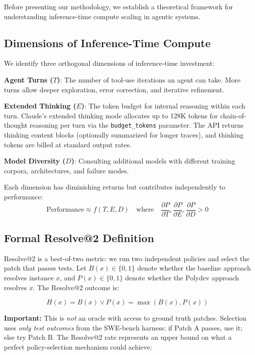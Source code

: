\documentclass[11pt,a4paper]{article}
\begin{document}
Before presenting our methodology, we establish a theoretical framework for understanding inference-time compute scaling in agentic systems.

\subsection{Dimensions of Inference-Time Compute}

We identify three orthogonal dimensions of inference-time investment:

\textbf{Agent Turns ($T$)}: The number of tool-use iterations an agent can take. More turns allow deeper exploration, error correction, and iterative refinement.

\textbf{Extended Thinking ($E$)}: The token budget for internal reasoning within each turn. Claude's extended thinking mode \citep{anthropic2024thinking,anthropic2024haiku45} allocates up to 128K tokens for chain-of-thought reasoning per turn via the \texttt{budget\_tokens} parameter. The API returns thinking content blocks (optionally summarized for longer traces), and thinking tokens are billed at standard output rates.

\textbf{Model Diversity ($D$)}: Consulting additional models with different training corpora, architectures, and failure modes.

Each dimension has diminishing returns but contributes independently to performance:
\begin{equation}
\text{Performance} \approx f(T, E, D) \quad \text{where} \quad \frac{\partial P}{\partial T}, \frac{\partial P}{\partial E}, \frac{\partial P}{\partial D} > 0
\end{equation}

\subsection{Formal Resolve@2 Definition}

Resolve@2 is a best-of-two metric: we run two independent policies and select the patch that passes tests. Let $B(x) \in \{0, 1\}$ denote whether the baseline approach resolves instance $x$, and $P(x) \in \{0, 1\}$ denote whether the Polydev approach resolves $x$. The Resolve@2 outcome is:

\begin{equation}
H(x) = B(x) \lor P(x) = \max(B(x), P(x))
\end{equation}

\textbf{Important:} This is \emph{not} an oracle with access to ground truth patches. Selection uses \emph{only test outcomes} from the SWE-bench harness: if Patch A passes, use it; else try Patch B. The Resolve@2 rate represents an upper bound on what a perfect policy-selection mechanism could achieve:
\end{document}
